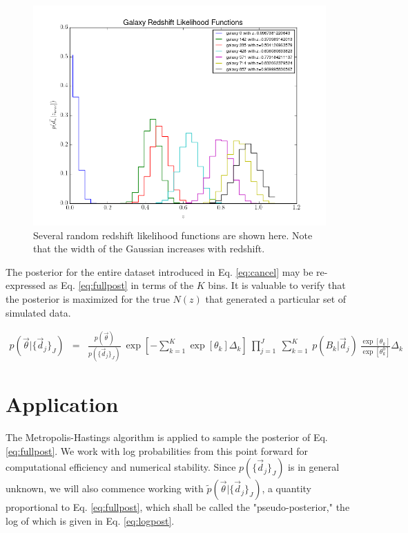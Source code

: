 \documentclass[12pt, onecolumn]{emulateapj}
\begin{document}
\begin{figure}
\label{fig:pzs}
\includegraphics[scale=0.5]{lik-samps.png}
\caption{Several random redshift likelihood functions are shown here.  Note that the width of the Gaussian increases with redshift.}
\end{figure}

The posterior for the entire dataset introduced in Eq. \ref{eq:cancel} may be re-expressed as Eq. \ref{eq:fullpost} in terms of the $K$ bins.  It is valuable to verify that the posterior is maximized for the true $N(z)$ that generated a particular set of simulated data.

\begin{eqnarray}
\label{eq:fullpost}
p(\vec{\theta}|\{\vec{d}_{j}\}_{J}) &=& \frac{p(\vec{\theta})}{p(\{\vec{d}_{j}\}_{J})}\ \exp\left[-\sum_{k=1}^{K}\exp[\theta_{k}]\Delta_{k}\right]\ \prod_{j=1}^{J}\ \sum_{k=1}^{K}\ p(B_{k}|\vec{d}_{j})\ \frac{\exp[\theta_{k}]}{\exp[\theta_{k}^{0}]}\Delta_{k}
\end{eqnarray}

\section{Application}

The Metropolis-Hastings algorithm is applied to sample the posterior of Eq. \ref{eq:fullpost}.  We work with log probabilities from this point forward for computational efficiency and numerical stability.  Since $p(\{\vec{d}_{j}\}_{J})$ is in general unknown, we will also commence working with $\tilde{p}(\vec{\theta}|\{\vec{d}_{j}\}_{J})$, a quantity proportional to Eq. \ref{eq:fullpost}, which shall be called the "pseudo-posterior," the log of which is given in Eq. \ref{eq:logpost}.
\end{document}
